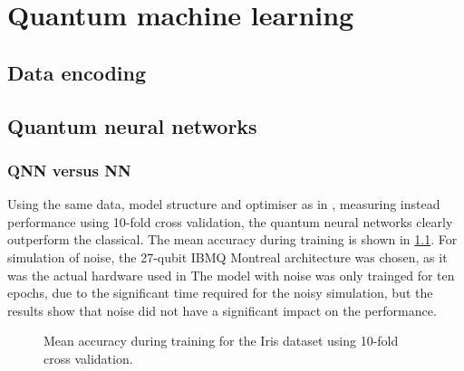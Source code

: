 \chapter{Quantum machine learning}

\section{Data encoding}

\section{Quantum neural networks}

\subsection{QNN versus NN}
Using the same data, model structure and optimiser as in \cite{abbas2021}, measuring instead performance using 10-fold cross validation, the quantum neural networks clearly outperform the classical. The mean accuracy during training is shown in \cref{fig:iris_training}. For simulation of noise, the 27-qubit IBMQ Montreal architecture was chosen, as it was the actual hardware used in \cite{abbas2021} The model with noise was only trainged for ten epochs, due to the significant time required for the noisy simulation, but the results show that noise did not have a significant impact on the performance.

\begin{figure}
    \centering
    \caption{Mean accuracy during training for the Iris dataset using 10-fold cross validation.}
    \label{fig:iris_training}
\end{figure}

